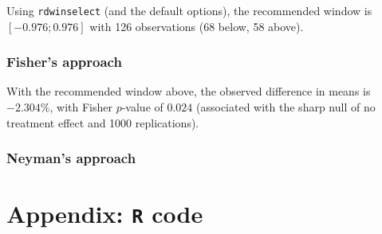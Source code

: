 \documentclass[12pt]{article}
\begin{document}
Using \verb|rdwinselect| (and the default options), the recommended window is $[-0.976;0.976]$ with 126 observations (68 below, 58 above).

\subsubsection{Fisher's approach}
With the recommended window above, the observed difference in means is $-2.304\%$, with Fisher $p$-value of $0.024$ (associated with the sharp null of no treatment effect and 1000 replications).

\subsubsection{Neyman's approach}

\newpage


\section{Appendix: \texttt{R} code}
\end{document}
